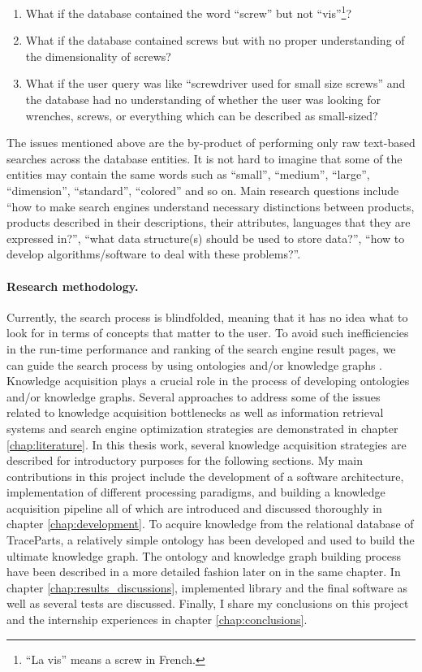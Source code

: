 \begin{enumerate}
	\item What if the database contained the word ``screw'' but not ``vis''\footnote{``La vis'' means 
		a screw in French.}?
	\item What if the database contained screws but with no proper understanding of the dimensionality 
		of screws?
	\item What if the user query was like ``screwdriver used for small size screws'' and the database 
		had no understanding of whether the user was looking for wrenches, screws, or everything which 
		can be described as small-sized?
\end{enumerate}

The issues mentioned above are the by-product of performing only raw text-based searches across the 
database entities. It is not hard to imagine that some of the entities may contain the same words 
such as ``small'', ``medium'', ``large'', ``dimension'', ``standard'', ``colored'' and so on. Main 
research questions include ``how to make search engines understand necessary distinctions between 
products, products described in their descriptions, their attributes, languages that they are 
expressed in?'', ``what data structure(s) should be used to store data?'', ``how to develop 
algorithms/software to deal with these problems?''.

\paragraph{Research methodology.}
Currently, the search process is blindfolded, meaning that it has no idea what to look for in terms of 
concepts that matter to the user. To avoid such inefficiencies in the run-time performance and ranking 
of the search engine result pages, we can guide the search process by using ontologies and/or 
knowledge graphs \cite{reinanda2020knowledge,dietz2018utilizing,chen2020review}. Knowledge acquisition 
plays a crucial role in the process of developing 
ontologies and/or knowledge graphs. Several approaches to address some of the issues related to 
knowledge acquisition bottlenecks as well as information retrieval systems and search engine 
optimization strategies are demonstrated in chapter \ref{chap:literature}. In this thesis work, 
several knowledge acquisition strategies 
are described for introductory purposes for the following sections. My main contributions in this 
project include the development of a software architecture, implementation of different processing 
paradigms, and building a knowledge acquisition pipeline all of which are introduced and discussed 
thoroughly in chapter \ref{chap:development}. To acquire knowledge from the relational database of 
TraceParts, a relatively simple ontology has been developed and used to build the ultimate knowledge 
graph. The ontology and knowledge graph building process have been described in a more detailed 
fashion later on in the same chapter. In chapter \ref{chap:results_discussions}, implemented library 
and the final software as well as several tests are discussed. Finally, I share my conclusions on 
this project and the internship experiences in chapter \ref{chap:conclusions}.

